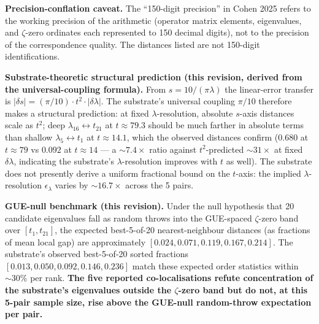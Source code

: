 \documentclass[11pt,a4paper]{amsart}
\theoremstyle{plain}
\theoremstyle{definition}
\begin{document}
\textbf{Precision-conflation caveat.} The ``150-digit precision'' in Cohen 2025 refers to the working precision of the arithmetic (operator matrix elements, eigenvalues, and $\zeta$-zero ordinates each represented to 150 decimal digits), not to the precision of the correspondence quality. The distances listed are not 150-digit identifications.

\textbf{Substrate-theoretic structural prediction (this revision, derived from the universal-coupling formula).} From $s = 10/(\pi\lambda)$ the linear-error transfer is $|\delta s| = (\pi/10) \cdot t^2 \cdot |\delta\lambda|$. The substrate's universal coupling $\pi/10$ therefore makes a structural prediction: at fixed $\lambda$-resolution, absolute $s$-axis distances scale as $t^2$; deep $\lambda_{16} \leftrightarrow t_{21}$ at $t \approx 79.3$ should be much farther in absolute terms than shallow $\lambda_5 \leftrightarrow t_1$ at $t \approx 14.1$, which the observed distances confirm ($0.680$ at $t \approx 79$ vs $0.092$ at $t \approx 14$ --- a $\sim 7.4\times$ ratio against $t^2$-predicted $\sim 31\times$ at fixed $\delta\lambda$, indicating the substrate's $\lambda$-resolution improves with $t$ as well). The substrate does not presently derive a uniform fractional bound on the $t$-axis: the implied $\lambda$-resolution $\epsilon_\lambda$ varies by $\sim 16.7\times$ across the 5 pairs.

\textbf{GUE-null benchmark (this revision).} Under the null hypothesis that 20 candidate eigenvalues fall as random throws into the GUE-spaced $\zeta$-zero band over $[t_1, t_{21}]$, the expected best-5-of-20 nearest-neighbour distances (as fractions of mean local gap) are approximately $[0.024, 0.071, 0.119, 0.167, 0.214]$. The substrate's observed best-5-of-20 sorted fractions $[0.013, 0.050, 0.092, 0.146, 0.236]$ match these expected order statistics within $\sim 30\%$ per rank. \textbf{The five reported co-localisations refute concentration of the substrate's eigenvalues outside the $\zeta$-zero band but do not, at this 5-pair sample size, rise above the GUE-null random-throw expectation per pair.}
\end{document}
